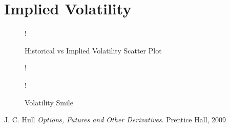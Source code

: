 \documentclass[11pt, fleqn]{article}
\begin{document}
\section{Implied Volatility}

\begin{figure}[!h]
   \centering 
   	\resizebox {0.6\textwidth} {!} { }
    \caption{Historical vs Implied Volatility Scatter Plot}
	\label{fig:q3-historical-vs-implied-volatility}
\end{figure}

\begin{figure}[!h]
   \centering 
   	\resizebox {0.6\textwidth} {!} { }
    \caption{}
	\label{fig:q3-volatility-days}
\end{figure}

\begin{figure}[!h]
   \centering 
   	\resizebox {0.6\textwidth} {!} { }
    \caption{Volatility Smile}
	\label{fig:q3-volatility-smile}
\end{figure}




















\begin{thebibliography}{9}
J. C. Hull
\textit{Options, Futures and Other Derivatives}. 
Prentice Hall, 2009

\end{thebibliography}
\end{document}
